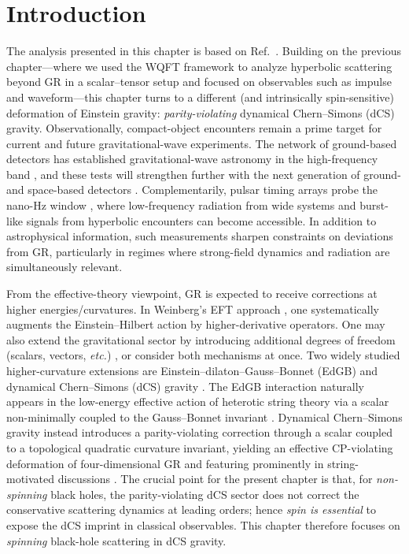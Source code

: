 \section{Introduction}
The analysis presented in this chapter is based on Ref.~\cite{Bhattacharyya:2024kxj}.
Building on the previous chapter—where we used the WQFT framework to analyze hyperbolic scattering beyond GR in a scalar--tensor setup and focused on observables such as impulse and waveform—this chapter turns to a different (and intrinsically spin-sensitive) deformation of Einstein gravity: \emph{parity-violating} dynamical Chern--Simons (dCS) gravity. Observationally, compact-object encounters remain a prime target for current and future gravitational-wave experiments. The network of ground-based detectors has established gravitational-wave astronomy in the high-frequency band \cite{LIGOScientific:2014oec,LIGOScientific:2016aoc,LIGOScientific:2016sjg,LIGOScientific:2016vlm,LIGOScientific:2017bnn,LIGOScientific:2019hgc}, and these tests will strengthen further with the next generation of ground- and space-based detectors \cite{hyp10}. Complementarily, pulsar timing arrays probe the nano-Hz window \cite{NANOGrav:2023gor,EPTA:2023fyk,NANOGrav:2023wsz,Verbiest:2024nid}, where low-frequency radiation from wide systems and burst-like signals from hyperbolic encounters can become accessible. In addition to astrophysical information, such measurements sharpen constraints on deviations from GR, particularly in regimes where strong-field dynamics and radiation are simultaneously relevant.

From the effective-theory viewpoint, GR is expected to receive corrections at higher energies/curvatures. In Weinberg’s EFT approach \cite{PhysRev.138.B988}, one systematically augments the Einstein--Hilbert action by higher-derivative operators. One may also extend the gravitational sector by introducing additional degrees of freedom (scalars, vectors, \emph{etc.}) \cite{Damour:1992we,Horbatsch:2015bua,Schon:2021pcv,Rainer:1996gw,DeFelice:2011bh}, or consider both mechanisms at once. Two widely studied higher-curvature extensions are Einstein--dilaton--Gauss--Bonnet (EdGB) and dynamical Chern--Simons (dCS) gravity \cite{Zwiebach:1985uq,Gross:1986mw,Jackiw:2003pm}. The EdGB interaction naturally appears in the low-energy effective action of heterotic string theory via a scalar non-minimally coupled to the Gauss--Bonnet invariant \cite{Zwiebach:1985uq,Gross:1986mw}. Dynamical Chern--Simons gravity instead introduces a parity-violating correction through a scalar coupled to a topological quadratic curvature invariant, yielding an effective CP-violating deformation of four-dimensional GR and featuring prominently in string-motivated discussions \cite{Alexander:2004us,Alexander:2004xd}. The crucial point for the present chapter is that, for \emph{non-spinning} black holes, the parity-violating dCS sector does not correct the conservative scattering dynamics at leading orders; hence \emph{spin is essential} to expose the dCS imprint in classical observables. This chapter therefore focuses on \emph{spinning} black-hole scattering in dCS gravity.

